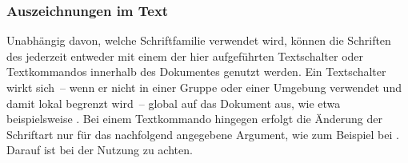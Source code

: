 \subsubsection{Auszeichnungen im Text}
%
%
%
Unabhängig davon, welche Schriftfamilie verwendet wird, können die Schriften 
des \CDs jederzeit entweder mit einem der hier aufgeführten Textschalter oder 
Textkommandos innerhalb des Dokumentes genutzt werden. Ein Textschalter wirkt 
sich~-- wenn er nicht in einer Gruppe oder einer Umgebung verwendet und damit 
lokal begrenzt wird~-- global auf das Dokument aus, wie etwa beispielsweise 
. Bei einem Textkommando hingegen erfolgt die Änderung der 
Schriftart nur für das nachfolgend angegebene Argument, wie zum Beispiel bei
. Darauf ist bei der Nutzung zu achten. 
%
